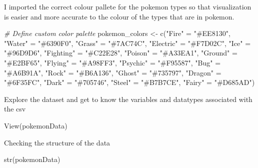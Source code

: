 \documentclass[
]{article}
\newenvironment{Shaded}{\begin{snugshade}}{\end{snugshade}}
\newcommand{\CommentTok}[1]{\textcolor[rgb]{0.56,0.35,0.01}{\textit{#1}}}
\newcommand{\FunctionTok}[1]{\textcolor[rgb]{0.00,0.00,0.00}{#1}}
\newcommand{\NormalTok}[1]{#1}
\newcommand{\OtherTok}[1]{\textcolor[rgb]{0.56,0.35,0.01}{#1}}
\newcommand{\StringTok}[1]{\textcolor[rgb]{0.31,0.60,0.02}{#1}}
\begin{document}
I imported the correct colour pallete for the pokemon types so that
visualization is easier and more accurate to the colour of the types
that are in pokemon.

\begin{Shaded}
\begin{Highlighting}[]
\CommentTok{\# Define custom color palette}
\NormalTok{pokemon\_colors }\OtherTok{\textless{}{-}} \FunctionTok{c}\NormalTok{(}\StringTok{"Fire"} \OtherTok{=} \StringTok{"\#EE8130"}\NormalTok{, }\StringTok{"Water"} \OtherTok{=} \StringTok{"\#6390F0"}\NormalTok{, }\StringTok{"Grass"} \OtherTok{=} \StringTok{"\#7AC74C"}\NormalTok{, }\StringTok{"Electric"} \OtherTok{=} \StringTok{"\#F7D02C"}\NormalTok{, }
                    \StringTok{"Ice"} \OtherTok{=} \StringTok{"\#96D9D6"}\NormalTok{, }\StringTok{"Fighting"} \OtherTok{=} \StringTok{"\#C22E28"}\NormalTok{, }\StringTok{"Poison"} \OtherTok{=} \StringTok{"\#A33EA1"}\NormalTok{, }\StringTok{"Ground"} \OtherTok{=} \StringTok{"\#E2BF65"}\NormalTok{, }
                    \StringTok{"Flying"} \OtherTok{=} \StringTok{"\#A98FF3"}\NormalTok{, }\StringTok{"Psychic"} \OtherTok{=} \StringTok{"\#F95587"}\NormalTok{, }\StringTok{"Bug"} \OtherTok{=} \StringTok{"\#A6B91A"}\NormalTok{, }\StringTok{"Rock"} \OtherTok{=} \StringTok{"\#B6A136"}\NormalTok{, }
                    \StringTok{"Ghost"} \OtherTok{=} \StringTok{"\#735797"}\NormalTok{, }\StringTok{"Dragon"} \OtherTok{=} \StringTok{"\#6F35FC"}\NormalTok{, }\StringTok{"Dark"} \OtherTok{=} \StringTok{"\#705746"}\NormalTok{, }\StringTok{"Steel"} \OtherTok{=} \StringTok{"\#B7B7CE"}\NormalTok{, }
                    \StringTok{"Fairy"} \OtherTok{=} \StringTok{"\#D685AD"}\NormalTok{)}
\end{Highlighting}
\end{Shaded}

Explore the dataset and get to know the variables and datatypes
associated with the csv

\begin{Shaded}
\begin{Highlighting}[]
\FunctionTok{View}\NormalTok{(pokemonData)}
\end{Highlighting}
\end{Shaded}

Checking the structure of the data

\begin{Shaded}
\begin{Highlighting}[]
\FunctionTok{str}\NormalTok{(pokemonData)}
\end{Highlighting}
\end{Shaded}
\end{document}

